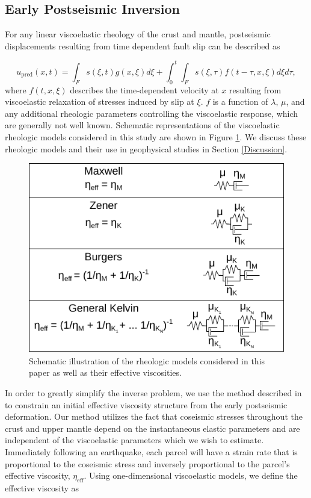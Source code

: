 \documentclass[draft,linenumbers]{AGUJournal}
\begin{document}
\subsection{Early Postseismic Inversion}\label{sec:InitialInversion}


For any linear viscoelastic rheology of the crust and mantle, postseismic displacements resulting from time dependent fault slip can be described as  

\begin{equation}\label{GeneralForward}
  u_\mathrm{pred}(x,t) = \int_F s(\xi,t)g(x,\xi)d\xi + 
           \int_0^t\int_F s(\xi,\tau) f(t-\tau,x,\xi) d\xi d\tau,
\end{equation}
where $f(t,x,\xi)$ describes the time-dependent velocity at $x$ resulting from viscoelastic relaxation of stresses induced by slip at $\xi$. $f$ is a function of $\lambda$, $\mu$, and any additional rheologic parameters controlling the viscoelastic response, which are generally not well known. Schematic representations of the viscoelastic rheologic models considered in this study are shown in Figure \ref{fig:Rheology}.  We discuss these rheologic models and their use in geophysical studies in Section \ref{Discussion}. 

\begin{figure}
\includegraphics[scale=0.8]{Figures/rheology}
\centering 
\caption{Schematic illustration of the rheologic models considered in this paper as well as their effective viscosities.}
\label{fig:Rheology}
\end{figure}

In order to greatly simplify the inverse problem, we use the method described in \citet{Hines2016} to constrain an initial effective viscosity structure from the early postseismic deformation.  Our method utilizes the fact that coseismic stresses throughout the crust and upper mantle depend on the instantaneous elastic parameters and are independent of the viscoelastic parameters which we wish to estimate. Immediately following an earthquake, each parcel will have a strain rate that is proportional to the coseismic stress and inversely proportional to the parcel's effective viscosity, 
$\eta_\mathrm{eff}$.  Using one-dimensional viscoelastic models, we define the effective viscosity as
\end{document}
